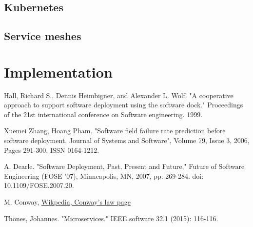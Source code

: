 \documentclass[conference]{IEEEtran}
\begin{document}
\subsection{Kubernetes}

\subsection{Service meshes}

\section{Implementation}

\begin{thebibliography}{00}

     Hall, Richard S., Dennis Heimbigner, and Alexander L. Wolf. "A cooperative approach to support software deployment using the software dock." Proceedings of the 21st international conference on Software engineering. 1999.

     Xuemei Zhang, Hoang Pham. "Software field failure rate prediction before software deployment, Journal of Systems and Software", Volume 79, Issue 3, 2006, Pages 291-300, ISSN 0164-1212.

     A. Dearle. "Software Deployment, Past, Present and Future," Future of Software Engineering (FOSE '07), Minneapolis, MN, 2007, pp. 269-284. doi: 10.1109/FOSE.2007.20.

     M. Conway, \href{https://en.wikipedia.org/wiki/Conway%27s_law}{Wikpedia, Conway's law page}

     Thönes, Johannes. "Microservices." IEEE software 32.1 (2015): 116-116.
\end{thebibliography}
\vspace{12pt}
\end{document}

